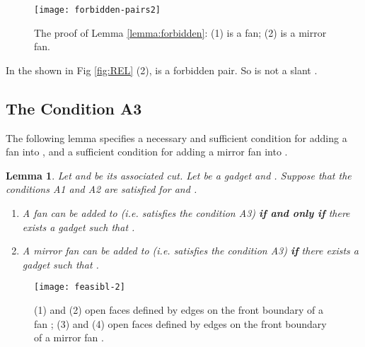 \documentclass[11pt]{article}
\newtheorem{lemma}[figure]{Lemma}
\begin{document}
\begin{figure}[ht]
\begin{center}
\texttt{[image: forbidden-pairs2]}
  \centering
\caption{The proof of Lemma \ref{lemma:forbidden}: (1)  is
a fan; (2)  is a mirror fan.}
\label{fig:forbbiden}
\end{center}
\end{figure}


In the   shown in Fig \ref{fig:REL} (2), 
is a forbidden pair. So  is not a slant .

\subsection{The Condition A3}

The following lemma specifies a necessary
and sufficient condition for adding a fan into , and
a sufficient condition for adding a mirror fan into .

\begin{lemma}\label{lemma:valid-fan}
Let  and  be its associated cut.
Let  be a gadget and . Suppose that the conditions
A1 and A2 are satisfied for  and .
\begin{enumerate}
\item A fan  can be added to  (i.e.  satisfies the condition A3)
{\bf if and only if} there exists a gadget  such that
.
\item A mirror fan  can be added to  (i.e.  satisfies the
condition A3) {\bf if} there exists a gadget  such that
.
\end{enumerate}
\end{lemma}

\begin{figure}[ht]
\begin{center}
\texttt{[image: feasibl-2]}
\centering
\caption{(1) and (2) open faces defined by edges on the front boundary of a fan ;
(3) and (4) open faces defined by edges on the front boundary of a mirror fan .}
\label{fig:feasible}
\end{center}
\end{figure}
\vspace{-0.2in}
\end{document}
